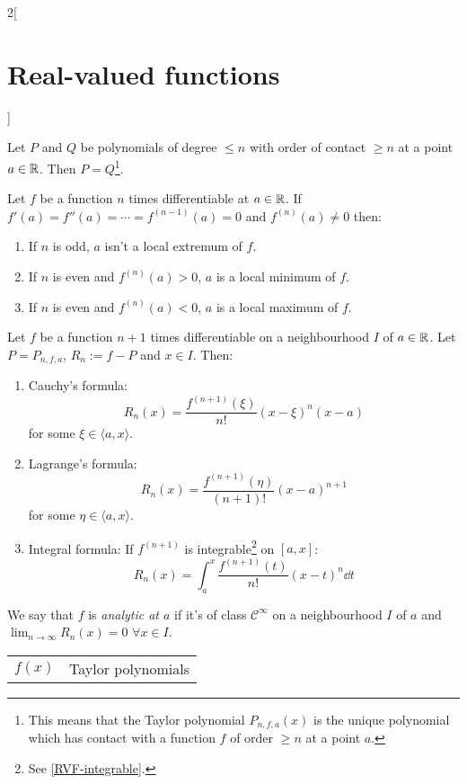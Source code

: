 \documentclass[../../../main.tex]{subfiles}
\begin{document}
\begin{multicols}{2}[\section{Real-valued functions}]
\begin{theorem}
  \end{theorem}
  \begin{prop}
    Let $P$ and $Q$ be polynomials of degree $\leq n$ with order of contact $\geq n$ at a point $a\in\mathbb{R}$. Then $P=Q$\footnote{This means that the Taylor polynomial $P_{n,f,a}(x)$ is the unique polynomial which has contact with a function $f$ of order $\geq n$ at a point $a$.}.
  \end{prop}
  \begin{theorem}
    Let $f$ be a function $n$ times differentiable at $a\in\mathbb{R}$. If $f'(a)=f''(a)=\cdots=f^{(n-1)}(a)=0$ and $f^{(n)}(a)\ne 0$ then:
    \begin{enumerate}
      \item If $n$ is odd, $a$ isn't a local extremum of $f$.
      \item If $n$ is even and $f^{(n)}(a)>0$, $a$ is a local minimum of $f$.
      \item If $n$ is even and $f^{(n)}(a)<0$, $a$ is a local maximum of $f$.
    \end{enumerate}
  \end{theorem}
  \begin{theorem}
    Let $f$ be a function $n+1$ times differentiable on a neighbourhood $I$ of $a\in\mathbb{R}$. Let $P=P_{n,f,a}$, $R_n:=f-P$ and $x\in I$. Then:
    \begin{enumerate}
      \item Cauchy's formula: $$R_n(x)=\frac{f^{(n+1)}(\xi)}{n!}{(x-\xi)}^n(x-a)$$ for some $\xi\in\langle a,x\rangle$.
      \item Lagrange's formula: $$R_n(x)=\frac{f^{(n+1)}(\eta)}{(n+1)!}{(x-a)}^{n+1}$$ for some $\eta\in\langle a,x\rangle$.
      \item Integral formula: If $f^{(n+1)}$ is integrable\footnote{See \cref{RVF-integrable}.} on $[a,x]$: $$R_n(x)=\int_a^x\frac{f^{(n+1)}(t)}{n!}{(x-t)}^n\dd t$$
    \end{enumerate}
  \end{theorem}
  \begin{definition}
    We say that $f$ is \textit{analytic at $a$} if it's of class $\mathcal{C}^\infty$ on a neighbourhood $I$ of $a$ and $\displaystyle\lim_{n\to\infty}R_n(x)=0$  $\forall x\in I$.
  \end{definition}
  \begin{center}
    \renewcommand*{\arraystretch}{2}
    \begin{tabular}{|c|>{\centering\arraybackslash}m{6.5cm}|}
      \hline
      $f(x)$                       & Taylor polynomials                                                                                     \\

\end{tabular}
\end{center}
\end{multicols}
\end{document}
